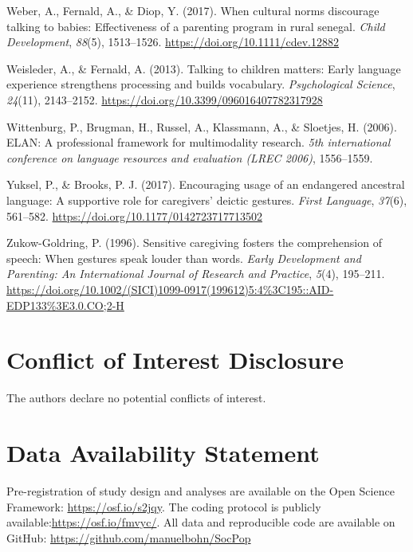 \documentclass[
  man,mask,floatsintext]{apa6}
\newlength{\cslhangindent}
\newlength{\cslentryspacingunit} %
\newenvironment{CSLReferences}[2] %
 {%
  \setlength{\parindent}{0pt}
  \ifodd #1
  \let\oldpar\par
  \def\par{\hangindent=\cslhangindent\oldpar}
  \fi
  \setlength{\parskip}{#2\cslentryspacingunit}
 }%
 {}
\begin{document}
\begin{CSLReferences}{1}{0}
\leavevmode{}%
Weber, A., Fernald, A., \& Diop, Y. (2017). When cultural norms discourage talking to babies: {Effectiveness} of a parenting program in rural senegal. \emph{Child Development}, \emph{88}(5), 1513--1526. \url{https://doi.org/10.1111/cdev.12882}

\leavevmode{}%
Weisleder, A., \& Fernald, A. (2013). Talking to children matters: {Early} language experience strengthens processing and builds vocabulary. \emph{Psychological Science}, \emph{24}(11), 2143--2152. \url{https://doi.org/10.3399/096016407782317928}

\leavevmode{}%
Wittenburg, P., Brugman, H., Russel, A., Klassmann, A., \& Sloetjes, H. (2006). ELAN: A professional framework for multimodality research. \emph{5th international conference on language resources and evaluation (LREC 2006)}, 1556--1559.

\leavevmode{}%
Yuksel, P., \& Brooks, P. J. (2017). Encouraging usage of an endangered ancestral language: {A} supportive role for caregivers' deictic gestures. \emph{First Language}, \emph{37}(6), 561--582. \url{https://doi.org/10.1177/0142723717713502}

\leavevmode{}%
Zukow-Goldring, P. (1996). Sensitive caregiving fosters the comprehension of speech: {When} gestures speak louder than words. \emph{Early Development and Parenting: An International Journal of Research and Practice}, \emph{5}(4), 195--211. \url{https://doi.org/10.1002/(SICI)1099-0917(199612)5:4\%3C195::AID-EDP133\%3E3.0.CO;2-H}

\end{CSLReferences}

\hypertarget{conflict-of-interest-disclosure}{%
\section{Conflict of Interest Disclosure}\label{conflict-of-interest-disclosure}}

The authors declare no potential conflicts of interest.

\hypertarget{data-availability-statement}{%
\section{Data Availability Statement}\label{data-availability-statement}}

Pre-registration of study design and analyses are available on the Open Science Framework: \url{https://osf.io/s2jqy}. The coding protocol is publicly available:\url{https://osf.io/fmvyc/}. All data and reproducible code are available on GitHub: \url{https://github.com/manuelbohn/SocPop}
\end{document}
